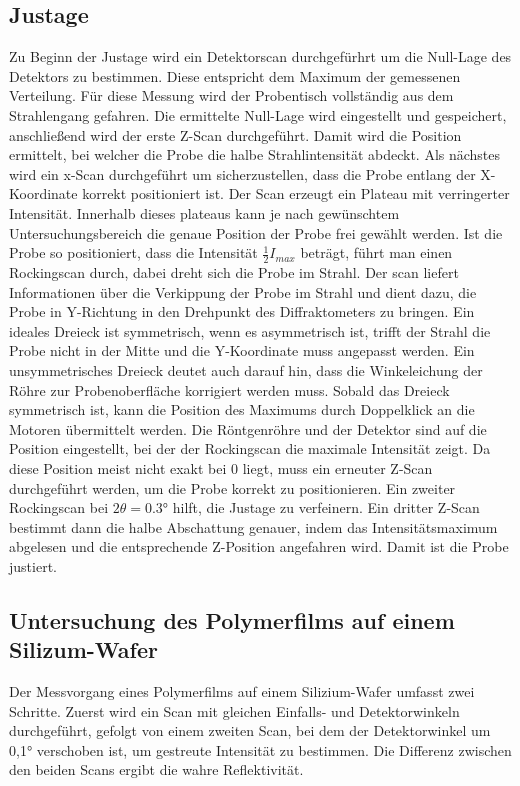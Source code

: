 \subsection{Justage}
Zu Beginn der Justage wird ein Detektorscan durchgefürhrt um die Null-Lage des Detektors zu bestimmen. Diese entspricht dem 
Maximum der gemessenen Verteilung. Für diese Messung wird der Probentisch vollständig aus dem Strahlengang gefahren. Die ermittelte Null-Lage wird eingestellt
und gespeichert, anschließend wird der erste Z-Scan durchgeführt. Damit wird die Position ermittelt, bei welcher die Probe die halbe Strahlintensität
abdeckt. Als nächstes wird ein x-Scan durchgeführt um sicherzustellen, dass die Probe entlang der X-Koordinate korrekt positioniert ist. Der Scan erzeugt ein Plateau 
mit verringerter Intensität. Innerhalb dieses plateaus kann je nach gewünschtem Untersuchungsbereich die genaue Position der Probe frei gewählt werden.
Ist die Probe so positioniert, dass die Intensität $\frac{1}{2}I_{max}$ beträgt, führt man einen Rockingscan durch, dabei dreht sich die Probe im Strahl.
Der scan liefert Informationen über die Verkippung der Probe im Strahl und dient dazu, die Probe in Y-Richtung in den Drehpunkt des Diffraktometers zu bringen.
Ein ideales Dreieck ist symmetrisch, wenn es asymmetrisch ist, trifft der Strahl die Probe nicht in der Mitte und die Y-Koordinate muss angepasst werden.
Ein unsymmetrisches Dreieck deutet auch darauf hin, dass die Winkeleichung der Röhre zur Probenoberfläche korrigiert werden muss. Sobald das Dreieck symmetrisch ist,
kann die Position des Maximums durch Doppelklick an die Motoren übermittelt werden. Die Röntgenröhre und der Detektor sind auf die Position eingestellt, bei der
der Rockingscan die maximale Intensität zeigt. Da diese Position meist nicht exakt bei 0 liegt, muss ein erneuter Z-Scan durchgeführt werden, um die Probe korrekt zu positionieren. 
Ein zweiter Rockingscan bei $2\theta = 0.3°$ hilft, die Justage zu verfeinern. Ein dritter Z-Scan bestimmt dann die halbe Abschattung genauer, 
indem das Intensitätsmaximum abgelesen und die entsprechende Z-Position angefahren wird. Damit ist die Probe justiert.

\subsection{Untersuchung des Polymerfilms auf einem Silizum-Wafer }
Der Messvorgang eines Polymerfilms auf einem Silizium-Wafer umfasst zwei Schritte. 
Zuerst wird ein Scan mit gleichen Einfalls- und Detektorwinkeln durchgeführt, gefolgt von einem zweiten Scan, bei dem der Detektorwinkel um 0,1° verschoben ist,
um gestreute Intensität zu bestimmen. Die Differenz zwischen den beiden Scans ergibt die wahre Reflektivität.

